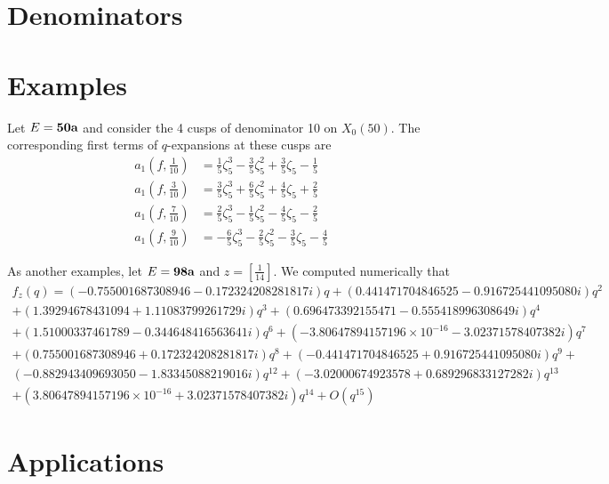 \documentclass [11pt, proquest] {uwthesis}[2015/03/03]
\begin{document}
\section{Denominators}



\section{Examples}

Let $E = {\bf 50a}$ and consider the 4 cusps of denominator 10 on $X_0(50)$. The corresponding first terms 
of $q$-expansions at these cusps are  
\begin{align*}
	a_1(f, \frac{1}{10}) &= \frac{1}{5} \zeta_{5}^{3} - \frac{3}{5} \zeta_{5}^{2} + \frac{3}{5} \zeta_{5} - \frac{1}{5} \\ 
	a_1(f, \frac{3}{10}) &= \frac{3}{5} \zeta_{5}^{3} + \frac{6}{5} \zeta_{5}^{2} + \frac{4}{5} \zeta_{5} + \frac{2}{5} \\
	a_1(f, \frac{7}{10}) &= \frac{2}{5} \zeta_{5}^{3} - \frac{1}{5} \zeta_{5}^{2} - \frac{4}{5} \zeta_{5} - \frac{2}{5}\\
	a_1(f, \frac{9}{10}) &=-\frac{6}{5} \zeta_{5}^{3} - \frac{2}{5} \zeta_{5}^{2} - \frac{3}{5} \zeta_{5} - \frac{4}{5}
\end{align*}

As another examples, let $E = {\bf 98a}$ and $z = [\frac{1}{14}]$. We computed numerically that
\begin{align*}
f_z(q) = \left(-0.755001687308946 - 0.172324208281817i\right)q + \left(0.441471704846525 - 0.916725441095080i\right)q^{2} \\ 
+ \left(1.39294678431094 + 1.11083799261729i\right)q^{3} + \left(0.696473392155471 - 0.555418996308649i\right)q^{4} \\ 
+ \left(1.51000337461789 - 0.344648416563641i\right)q^{6} + \left(-3.80647894157196 \times 10^{-16} - 3.02371578407382i\right)q^{7} \\
+ \left(0.755001687308946 + 0.172324208281817i\right)q^{8} + \left(-0.441471704846525 + 0.916725441095080i\right)q^{9} +  \\ 
\left(-0.882943409693050 - 1.83345088219016i\right)q^{12} + \left(-3.02000674923578 + 0.689296833127282i\right)q^{13} \\
+ \left(3.80647894157196 \times 10^{-16} + 3.02371578407382i\right)q^{14} + O(q^{15})
\end{align*}


\section{Applications}
\end{document}
